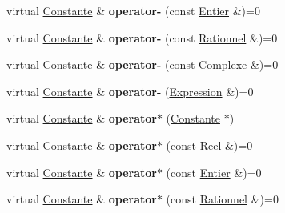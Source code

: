 \begin{DoxyCompactItemize}
\item 
\hypertarget{class_constante_a0227e180269d318299bf7981a639d196}{virtual \hyperlink{class_constante}{Constante} \& {\bfseries operator-\/} (const \hyperlink{class_entier}{Entier} \&)=0}\label{class_constante_a0227e180269d318299bf7981a639d196}

\item 
\hypertarget{class_constante_aa525b610edbed58856836181b8ea78f8}{virtual \hyperlink{class_constante}{Constante} \& {\bfseries operator-\/} (const \hyperlink{class_rationnel}{Rationnel} \&)=0}\label{class_constante_aa525b610edbed58856836181b8ea78f8}

\item 
\hypertarget{class_constante_aa8f176be374c96fbe1c24716eabf9b07}{virtual \hyperlink{class_constante}{Constante} \& {\bfseries operator-\/} (const \hyperlink{class_complexe}{Complexe} \&)=0}\label{class_constante_aa8f176be374c96fbe1c24716eabf9b07}

\item 
\hypertarget{class_constante_aca98518ee0933a3eabe01da0739e36be}{virtual \hyperlink{class_constante}{Constante} \& {\bfseries operator-\/} (\hyperlink{class_expression}{Expression} \&)=0}\label{class_constante_aca98518ee0933a3eabe01da0739e36be}

\item 
\hypertarget{class_constante_a4293c8632cc246b0e88285ae4afd2128}{virtual \hyperlink{class_constante}{Constante} \& {\bfseries operator$\ast$} (\hyperlink{class_constante}{Constante} $\ast$)}\label{class_constante_a4293c8632cc246b0e88285ae4afd2128}

\item 
\hypertarget{class_constante_a44b5993c7da0b9e89a40980f2bcb8f1e}{virtual \hyperlink{class_constante}{Constante} \& {\bfseries operator$\ast$} (const \hyperlink{class_reel}{Reel} \&)=0}\label{class_constante_a44b5993c7da0b9e89a40980f2bcb8f1e}

\item 
\hypertarget{class_constante_aeabf86524c5dca456de99068eff0faa0}{virtual \hyperlink{class_constante}{Constante} \& {\bfseries operator$\ast$} (const \hyperlink{class_entier}{Entier} \&)=0}\label{class_constante_aeabf86524c5dca456de99068eff0faa0}

\item 
\hypertarget{class_constante_a4b7d7328c364c30e53c5045eea6fe58c}{virtual \hyperlink{class_constante}{Constante} \& {\bfseries operator$\ast$} (const \hyperlink{class_rationnel}{Rationnel} \&)=0}\label{class_constante_a4b7d7328c364c30e53c5045eea6fe58c}


\end{DoxyCompactItemize}
